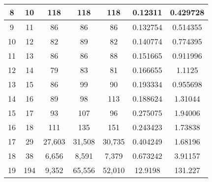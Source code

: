 \documentclass[conference]{IEEEtran}
\begin{document}
\begin{table*}[ht]
\begin{tabular}{|c|c|c|c|c|c|c|}
8                  & 10                     & 118                     & 118                        & 118                         & 0.12311             & 0.429728              \\ \hline
9                  & 11                     & 86                      & 86                         & 86                          & 0.132754            & 0.514355              \\ \hline
10                 & 12                     & 82                      & 89                         & 82                          & 0.140774            & 0.774395              \\ \hline
11                 & 13                     & 86                      & 86                         & 88                          & 0.151665            & 0.911996              \\ \hline
12                 & 14                     & 79                      & 83                         & 81                          & 0.166655            & 1.1125                \\ \hline
13                 & 15                     & 86                      & 99                         & 90                          & 0.193334            & 0.955698              \\ \hline
14                 & 16                     & 89                      & 98                         & 113                         & 0.188624            & 1.31044               \\ \hline
15                 & 17                     & 93                      & 107                        & 96                          & 0.275075            & 1.94006               \\ \hline
16                 & 18                     & 111                     & 135                        & 151                         & 0.243423            & 1.73838               \\ \hline
17                 & 29                     & 27,603                  & 31,508                     & 30,735                      & 0.404249            & 1.68196               \\ \hline
18                 & 38                     & 6,656                   & 8,591                      & 7,379                       & 0.673242            & 3.91157               \\ \hline
19                 & 194                    & 9,352                   & 65,556                     & 52,010                      & 12.9198             & 131.227               \\ \hline
\end{tabular}
\label{tab:summary_results}
\end{table*}
\end{document}

